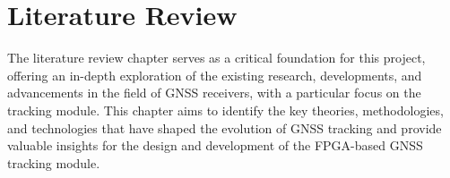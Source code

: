 \chapter{Literature Review}

The literature review chapter serves as a critical foundation for this project, offering an in-depth exploration of the existing research, developments, and advancements in the field of GNSS receivers, with a particular focus on the tracking module. This chapter aims to identify the key theories, methodologies, and technologies that have shaped the evolution of GNSS tracking and provide valuable insights for the design and development of the FPGA-based GNSS tracking module.